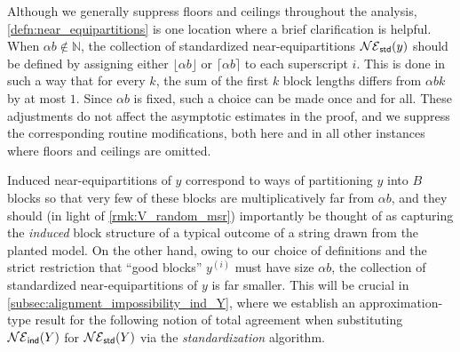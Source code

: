 \documentclass[11pt]{amsart}
\numberwithin{equation}{section}
\numberwithin{equation}{section}
\newcommand{\1}{\mathbbm{1}}
\newcommand{\ind}{\textup{\textsf{ind}}}
\newcommand{\std}{\textup{\textsf{std}}}
\theoremstyle{definition}
\newenvironment{remark}
  {\pushQED{\qed}\renewcommand{\qedsymbol}{$\triangle$}\remarkx}
  {\popQED\endremarkx}
\begin{document}
\begin{remark}
    Although we generally suppress floors and ceilings throughout the analysis, \cref{defn:near_equipartitions} is one location where a brief clarification is helpful. When $\alpha b \notin \mathbb N$, the collection of standardized near-equipartitions $\mathcal{NE}_\std(y)$ should be defined by assigning either $\lfloor \alpha b\rfloor$ or $\lceil \alpha b\rceil$ to each superscript $i$. This is done in such a way that for every $k$, the sum of the first $k$ block lengths differs from $\alpha b k$ by at most $1$. Since $\alpha b$ is fixed, such a choice can be made once and for all. These adjustments do not affect the asymptotic estimates in the proof, and we suppress the corresponding routine modifications, both here and in all other instances where floors and ceilings are omitted.
\end{remark}

Induced near-equipartitions of $y$ correspond to ways of partitioning $y$ into $B$ blocks so that very few of these blocks are multiplicatively far from $\alpha b$, and they should (in light of \cref{rmk:V_random_msr}) importantly be thought of as capturing the \textit{induced} block structure of a typical outcome of a string drawn from the planted model. On the other hand, owing to our choice of definitions and the strict restriction that ``good blocks'' $y^{(i)}$ must have size $\alpha b$, the collection of standardized near-equipartitions of $y$ is far smaller. This will be crucial in \cref{subsec:alignment_impossibility_ind_Y}, where we establish an approximation-type result for the following notion of total agreement when substituting $\mathcal{NE}_\ind(Y)$ for $\mathcal{NE}_\std(Y)$ via the \textit{standardization} algorithm.
\end{document}
